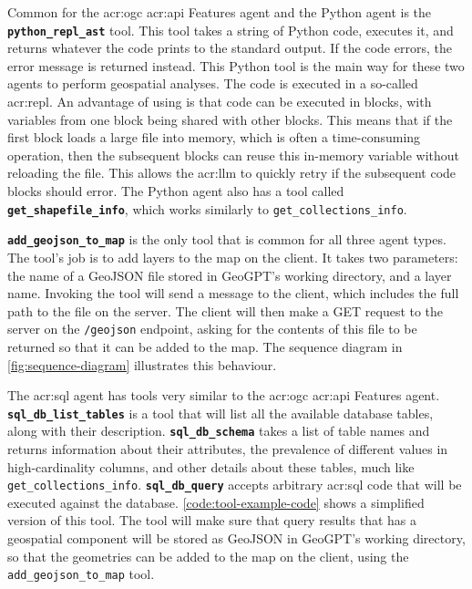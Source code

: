 Common for the \acrshort{acr:ogc} \acrshort{acr:api} Features agent and the Python agent is the \textbf{\texttt{python\_repl\_ast}} tool. This tool takes a string of Python code, executes it, and returns whatever the code prints to the standard output. If the code errors, the error message is returned instead. This Python tool is the main way for these two agents to perform geospatial analyses. The code is executed in a so-called \acrfull{acr:repl}. An advantage of using  is that code can be executed in blocks, with variables from one block being shared with other blocks. This means that if the first block loads a large file into memory, which is often a time-consuming operation, then the subsequent blocks can reuse this in-memory variable without reloading the file. This allows the \acrshort{acr:llm} to quickly retry if the subsequent code blocks should error. The Python agent also has a tool called \textbf{\texttt{get\_shapefile\_info}}, which works similarly to \texttt{get\_collections\_info}.

\textbf{\texttt{add\_geojson\_to\_map}} is the only tool that is common for all three agent types. The tool's job is to add layers to the map on the client. It takes two parameters: the name of a GeoJSON file stored in GeoGPT's working directory, and a layer name. Invoking the tool will send a message to the client, which includes the full path to the file on the server. The client will then make a GET request to the server on the \texttt{/geojson} endpoint, asking for the contents of this file to be returned so that it can be added to the map. The sequence diagram in \autoref{fig:sequence-diagram} illustrates this behaviour.

The \acrshort{acr:sql} agent has tools very similar to the \acrshort{acr:ogc} \acrshort{acr:api} Features agent. \textbf{\texttt{sql\_db\_list\_tables}} is a tool that will list all the available database tables, along with their description. \textbf{\texttt{sql\_db\_schema}} takes a list of table names and returns information about their attributes, the prevalence of different values in high-cardinality columns, and other details about these tables, much like \texttt{get\_collections\_info}. \textbf{\texttt{sql\_db\_query}} accepts arbitrary \acrshort{acr:sql} code that will be executed against the database. \autoref{code:tool-example-code} shows a simplified version of this tool. The tool will make sure that query results that has a geospatial component will be stored as GeoJSON in GeoGPT's working directory, so that the geometries can be added to the map on the client, using the \texttt{add\_geojson\_to\_map} tool.


